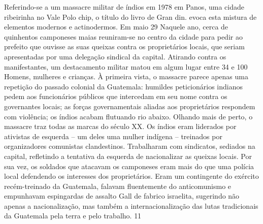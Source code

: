 Referindo-se a um massacre militar de índios em 1978 em Panos, uma cidade ribeirinha no Vale Polo chip, o título do livro de Gran din. evoca esta mistura de elementos modernos e actinodermos. Em maio
 {\color{blue} 29}  
Naquele ano, cerca de quinhentos camponeses maias reuniram-se no centro da cidade para pedir ao prefeito que ouvisse as suas queixas contra os proprietários locais, que seriam apresentadas por uma delegação sindical da capital. Atirando contra os manifestantes, um destacamento militar matou em algum lugar entre
 {\color{blue} 34}  
e
 {\color{blue} 100}  
Homens, mulheres e crianças. À primeira vista, o massacre parece apenas uma repetição do passado colonial da Guatemala: humildes peticionários indianos pedem aos funcionários públicos que intercedam em seu nome contra os governantes locais; as forças governamentais aliadas aos proprietários respondem com violência; os índios acabam flutuando rio abaixo. Olhando mais de perto, o massacre traz todas as marcas do século XX. Os índios eram liderados por ativistas de esquerda – um deles uma mulher indígena – treinados por organizadores comunistas clandestinos. Trabalharam com sindicatos, sediados na capital, refletindo a tentativa da esquerda de nacionalizar as queixas locais. Por sua vez, os soldados que atacavam os camponeses eram mais do que uma polícia local defendendo os interesses dos proprietários. Eram um contingente do exército recém-treinado da Guatemala, falavam fluentemente do anticomunismo e empunhavam espingardas de assalto Gall de fabrico israelita, sugerindo não apenas a nacionalização, mas também a internacionalização das lutas tradicionais da Guatemala pela terra e pelo trabalho.
 {\color{blue} 11}  

 
\par
 
